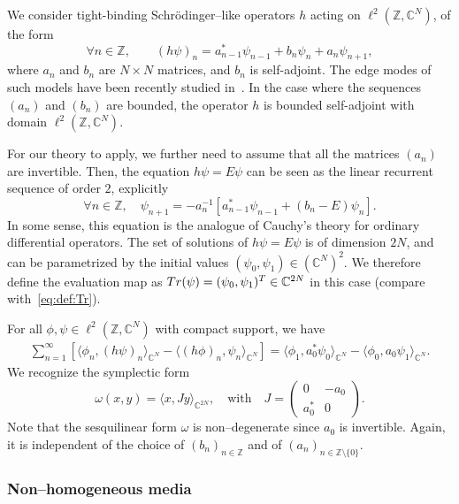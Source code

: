 \documentclass[11pt]{amsart}
\numberwithin{equation}{section} %
\newcommand\1{{\mathds 1}}
\def\C{{\mathbb C}}
\def\Z{{\mathbb Z}}
\def\bra{\langle}
\def\ket{\rangle}
\def\Tr{{\rm Tr}}
\begin{document}
We consider  tight-binding Schrödinger--like operators $h$ acting on $\ell^2(\Z, \C^N)$, of the form
\[
    \forall n \in \Z, \qquad (h \psi)_n = a_{n-1}^* \psi_{n-1} + b_n \psi_n + a_n \psi_{n+1},
\]
where $a_n$ and $b_n$ are $N \times N$ matrices, and $b_n$ is self-adjoint. The edge modes of such models have been recently studied in~\cite{GomGonVan-24}. In the case where the sequences $(a_n)$ and $(b_n)$ are bounded, the operator $h$ is bounded self-adjoint with domain $\ell^2(\Z, \C^N)$. 

\medskip

For our theory to apply, we further need to assume that all the matrices $(a_n)$ are invertible. Then, the equation $h \psi = E \psi$ can be seen as the linear recurrent sequence of order $2$, explicitly
\[
\forall n \in \Z, \quad \psi_{n+1} = - a_n^{-1} \left[  a_{n-1}^* \psi_{n-1} + (b_n - E) \psi_n \right].
\]
In some sense, this equation is the analogue of Cauchy's theory for ordinary differential operators. The set of solutions of $h \psi = E \psi$ is of dimension $2N$, and can be parametrized by the initial values $(\psi_0, \psi_1) \in (\C^N)^2$. We therefore define the evaluation map as $\Tr(\psi) = (\psi_0, \psi_1)^T \in \C^{2N}$ in this case (compare with~\eqref{eq:def:Tr}).

\medskip

For all $\phi, \psi \in \ell^2(\Z, \C^N)$ with compact support, we have
\begin{align*}
    \sum_{n=1}^\infty \left[ \bra \phi_n, (h \psi)_n \ket_{\C^N} - \bra (h \phi)_n,  \psi_n \ket_{\C^N} \right] 
= \bra \phi_1, a_0^* \psi_0 \ket_{\C^N} -  \bra \phi_0, a_0 \psi_1 \ket_{\C^N}.
\end{align*}
We recognize the symplectic form
\[
\omega(x, y) = \bra x, J y \ket_{\C^{2N}}, \quad \text{with} \quad J = \begin{pmatrix}
    0 & -a_0 \\ a_0^* & 0
\end{pmatrix}.
\]
Note that the sesquilinear form $\omega$ is non--degenerate since $a_0$ is invertible. Again, it is independent of the choice of $(b_n)_{n \in \Z}$ and of $(a_n)_{n \in \Z \setminus \{ 0 \}}$. 


\subsubsection{Non--homogeneous media}
\end{document}
